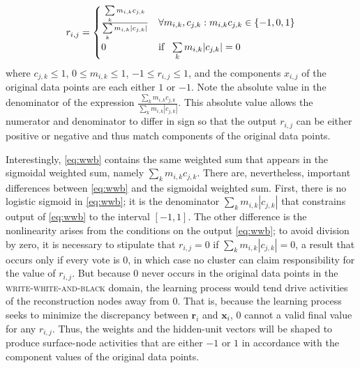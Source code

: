  \begin{align}\label{eq:wwb}
  r_{i,j} &=
    \begin{cases}
      \frac{\sum\limits_{k} m_{i,k} c_{j,k}}{\sum\limits_{k} m_{i,k} |c_{j,k}|} & \text{$\forall m_{i,k}, c_{j,k} : m_{i,k} c_{j,k} \in \{-1,0,1\} $}\\
      0 & \text{if \, $\sum\limits_{k} m_{i,k} |c_{j,k}|= 0$}\\
    \end{cases} \\
 \end{align}
where $c_{j,k} \leq 1$, $0 \leq  m_{i,k} \leq  1$,  $-1 \leq  r_{i,j} \leq  1$, 
and the components $x_{i,j}$ of the original data points
are each either $1$ or  $-1$. Note the absolute value in the denominator 
of the expression $\frac{\sum_{k} m_{i,k} c_{j,k}}{\sum_{k} m_{i,k} |c_{j,k}|}$. 
This absolute value allows the numerator and denominator to differ in sign so that 
the output $r_{i,j}$ can be either positive or negative and thus match components of the original data points.

 Interestingly, \eqref{eq:wwb} contains the same weighted sum
that appears in the sigmoidal weighted sum, namely $\sum\limits_{k} m_{i,k} c_{j,k}$.
 There are, nevertheless, important differences 
 between \eqref{eq:wwb} and the sigmoidal weighted sum. First, there is 
 no logistic sigmoid in \eqref{eq:wwb}; it is the denominator $\sum_{k} m_{i,k} |c_{j,k}|$ 
 that constrains output of \eqref{eq:wwb} to the interval $[-1,1]$. The other 
 difference is the nonlinearity arises from the conditions on the output \eqref{eq:wwb}; 
 to avoid division by zero, it is necessary to stipulate that $r_{i,j}=0$ if 
 $\sum_{k} m_{i,k} |c_{j,k}| = 0$, a result that occurs only if every vote is 0, 
 in which case no cluster can claim responsibility for the value of $r_{i,j}$. But 
 because $0$ never occurs in the original data points in the \textsc{write-white-and-black} 
 domain, the learning process would tend drive activities of the reconstruction nodes 
 away from $0$. That is, because the learning process seeks to minimize the discrepancy 
 between $\textbf{r}_i$ and $\textbf{x}_i$, $0$ cannot a valid final value for any $r_{i,j}$.  
 Thus, the weights and the hidden-unit vectors will be shaped to produce surface-node 
 activities that are either $-1$ or $1$ in accordance with the component values of 
 the original data points. 

